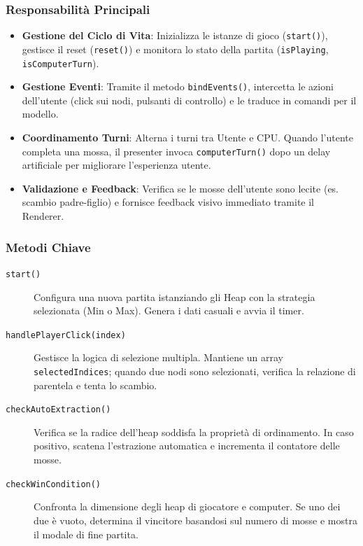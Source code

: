 \documentclass[openany]{theme/uniprthesis}
\begin{document}
\subsubsection*{Responsabilità Principali}
\begin{itemize}
    \item \textbf{Gestione del Ciclo di Vita}: Inizializza le istanze di gioco (\texttt{start()}), gestisce il reset (\texttt{reset()}) e monitora lo stato della partita (\texttt{isPlaying}, \texttt{isComputerTurn}).
    \item \textbf{Gestione Eventi}: Tramite il metodo \texttt{bindEvents()}, intercetta le azioni dell'utente (click sui nodi, pulsanti di controllo) e le traduce in comandi per il modello.
    \item \textbf{Coordinamento Turni}: Alterna i turni tra Utente e CPU. Quando l'utente completa una mossa, il presenter invoca \texttt{computerTurn()} dopo un delay artificiale per migliorare l'esperienza utente.
    \item \textbf{Validazione e Feedback}: Verifica se le mosse dell'utente sono lecite (es. scambio padre-figlio) e fornisce feedback visivo immediato tramite il Renderer.
\end{itemize}

\subsubsection*{Metodi Chiave}
\begin{description}
    \item[\texttt{start()}] Configura una nuova partita istanziando gli Heap con la strategia selezionata (Min o Max). Genera i dati casuali e avvia il timer.
    \item[\texttt{handlePlayerClick(index)}] Gestisce la logica di selezione multipla. Mantiene un array \texttt{selectedIndices}; quando due nodi sono selezionati, verifica la relazione di parentela e tenta lo scambio.
    \item[\texttt{checkAutoExtraction()}] Verifica se la radice dell'heap soddisfa la proprietà di ordinamento. In caso positivo, scatena l'estrazione automatica e incrementa il contatore delle mosse.
    \item[\texttt{checkWinCondition()}] Confronta la dimensione degli heap di giocatore e computer. Se uno dei due è vuoto, determina il vincitore basandosi sul numero di mosse e mostra il modale di fine partita.
\end{description}
\end{document}
